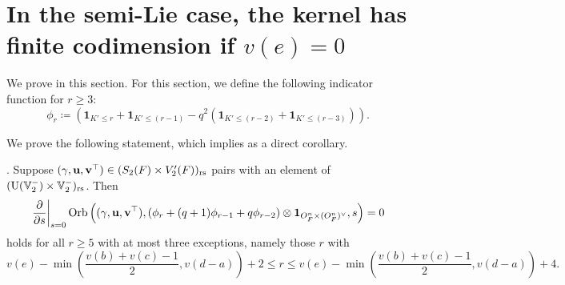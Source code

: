 \section{In the semi-Lie case, the kernel has finite codimension if $v(e)=0$}
We prove  in this section.
For this section, we define the following indicator function for $r \ge 3$:
\[
  \phi_r \coloneqq \left( \mathbf{1}_{K' \le r} + \mathbf{1}_{K' \le (r-1)}
   - q^2 (\mathbf{1}_{K' \le (r-2)} + \mathbf{1}_{K' \le (r-3)}) \right).
 \]

We prove the following statement,
which implies  as a direct corollary.
\begin{theorem}
  \label{thm:semi_lie_finite_codim_full}.
  Suppose ${(\gamma, \mathbf u, \mathbf v^\top)} \in (S_2(F) \times V_2'(F))_{\mathrm{rs}}$
  pairs with an element of $(\operatorname{U}(\mathbb V_2^-) \times \mathbb V_2^-)_{\mathrm{rs}}$.
  Then
  \[
    \left. \pdv{}{s} \right\rvert_{s=0}
    \operatorname{Orb} \left( {(\gamma, \mathbf u, \mathbf v^\top)}, (\phi_r + (q+1)\phi_{r-1} + q\phi_{r-2}) \otimes \mathbf{1}_{O_F^n \times (O_F^n)^\vee}, s \right) = 0
  \]
  holds for all $r \ge 5$ with at most three exceptions,
  namely those $r$ with
  \[ v(e) - \min\left(\frac{v(b)+v(c)-1}{2}, v(d-a)\right) + 2
    \le r \le v(e) - \min\left(\frac{v(b)+v(c)-1}{2}, v(d-a)\right) + 4. \]
\end{theorem}
